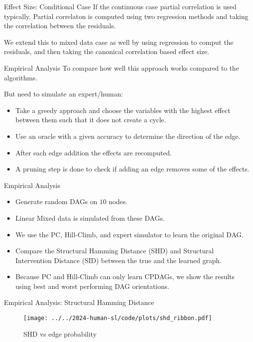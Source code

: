 \documentclass{beamer}
\begin{document}
\begin{frame}{Effect Size: Conditional Case}
	If the continuous case partial correlation is used typically. Partial correlaton is computed using two regression methods and taking the correlation between the residuals.

	We extend this to mixed data case as well by using regression to comput the residuals, and then taking the canonical correlation based effect size.
\end{frame}

\begin{frame}{Empirical Analysis}
	To compare how well this approach works compared to the algorithms.

	But need to simulate an expert/human:
	\begin{itemize}
		\item Take a greedy approach and choose the variables with the highest effect between them such that it does not create a cycle.
		\item Use an oracle with a given accuracy to determine the direction of the edge.
		\item After each edge addition the effects are recomputed.
		\item A pruning step is done to check if adding an edge removes some of the effects.
	\end{itemize}
\end{frame}

\begin{frame}{Empirical Analysis}
	\begin{itemize}
		\item Generate random DAGs on $10$ nodes.
		\item Linear Mixed data is simulated from these DAGs.
		\item We use the PC, Hill-Climb, and expert simulator to learn the original DAG.
		\item Compare the Structural Hamming Distance (SHD) and Structural Intervention Distance (SID) between the true and the learned graph.
		\item Because PC and Hill-Climb can only learn CPDAGs, we show the results using best and worst performing DAG orientations.
	\end{itemize}
\end{frame}


\begin{frame}{Empirical Analysis: Structural Hamming Distance}
	\begin{figure}
		\centering
		\texttt{[image: ../../2024-human-sl/code/plots/shd\_ribbon.pdf]}
		\caption{SHD vs edge probability}
	\end{figure}
\end{frame}
\end{document}
